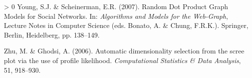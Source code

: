 \documentclass[11pt]{article}
\newlength{\cslhangindent}
\newenvironment{CSLReferences}[3] %
 {%
  \setlength{\parindent}{0pt}
  \ifodd #1 \everypar{\setlength{\hangindent}{\cslhangindent}}\ignorespaces\fi
  \ifnum #2 > 0
  \setlength{\parskip}{#2\baselineskip}
  \fi
 }%
 {}
\begin{document}
\begin{CSLReferences}{1}{0}
\leavevmode\hypertarget{ref-Young2007RanDot}{}%
Young, S.J. \& Scheinerman, E.R. (2007). Random Dot Product Graph Models
for Social Networks. In: \emph{Algorithms and Models for the Web-Graph},
Lecture Notes in Computer Science (eds. Bonato, A. \& Chung, F.R.K.).
Springer, Berlin, Heidelberg, pp. 138--149.

\leavevmode\hypertarget{ref-Zhu2006AutDim}{}%
Zhu, M. \& Ghodsi, A. (2006). Automatic dimensionality selection from
the scree plot via the use of profile likelihood. \emph{Computational
Statistics \& Data Analysis}, 51, 918--930.

\end{CSLReferences}
\end{document}
